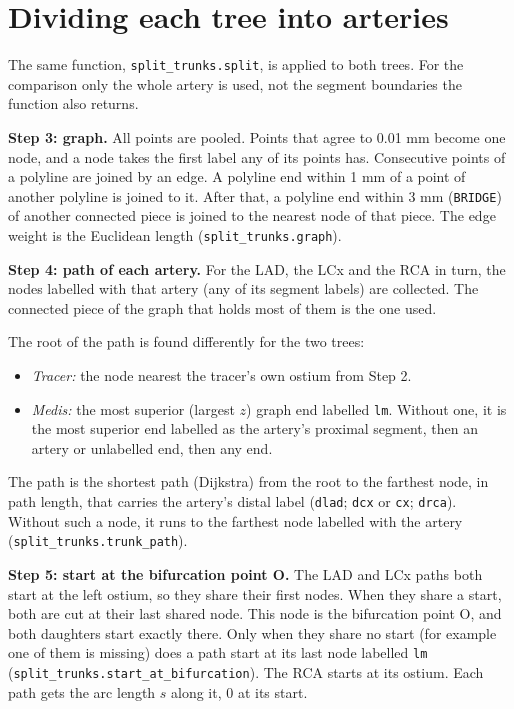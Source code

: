 \documentclass[11pt,a4paper]{article}
\newcommand{\code}[1]{\texttt{#1}}
\begin{document}
\section{Dividing each tree into arteries}

The same function, \code{split\_trunks.split}, is applied to both trees. For the comparison only the
whole artery is used, not the segment boundaries the function also returns.

\textbf{Step 3: graph.} All points are pooled. Points that agree to 0.01 mm become one node, and a node
takes the first label any of its points has. Consecutive points of a polyline are joined by an edge.
A polyline end within 1 mm of a point of another polyline is joined to it. After that, a polyline end
within 3 mm (\code{BRIDGE}) of another connected piece is joined to the nearest node of that piece. The
edge weight is the Euclidean length (\code{split\_trunks.graph}).

\textbf{Step 4: path of each artery.} For the LAD, the LCx and the RCA in turn, the nodes labelled with
that artery (any of its segment labels) are collected. The connected piece of the graph that holds most
of them is the one used.

The root of the path is found differently for the two trees:
\begin{itemize}
\item \emph{Tracer:} the node nearest the tracer's own ostium from Step 2.
\item \emph{Medis:} the most superior (largest $z$) graph end labelled \code{lm}. Without one, it is the
most superior end labelled as the artery's proximal segment, then an artery or unlabelled end, then
any end.
\end{itemize}

The path is the shortest path (Dijkstra) from the root to the farthest node, in path length, that
carries the artery's distal label (\code{dlad}; \code{dcx} or \code{cx}; \code{drca}). Without such a
node, it runs to the farthest node labelled with the artery (\code{split\_trunks.trunk\_path}).

\textbf{Step 5: start at the bifurcation point O.} The LAD and LCx paths both start at the left ostium,
so they share their first nodes. When they share a start, both are cut at their last shared node. This
node is the bifurcation point O, and both daughters start exactly there. Only when they share no start
(for example one of them is missing) does a path start at its last node labelled \code{lm}
(\code{split\_trunks.start\_at\_bifurcation}). The RCA starts at its ostium. Each path gets the arc length
$s$ along it, 0 at its start.
\end{document}

